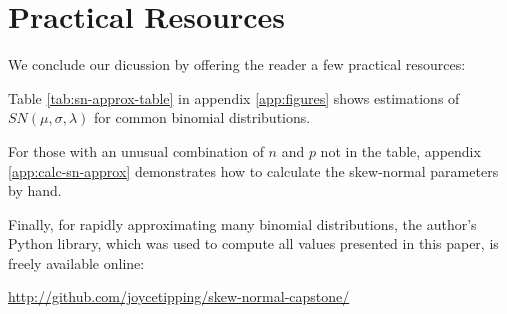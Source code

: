 \section{Practical Resources}
\label{sec:resources}

We conclude our dicussion by offering the reader a few practical resources:

Table \ref{tab:sn-approx-table} in appendix \ref{app:figures} shows estimations
of $SN(\mu, \sigma, \lambda)$ for common binomial distributions.

For those with an unusual combination of $n$ and $p$ not in the table, appendix
\ref{app:calc-sn-approx} demonstrates how to calculate the skew-normal
parameters by hand.

Finally, for rapidly approximating many binomial distributions, the author's
Python library, which was used to compute all values presented in this paper,
is freely available online:

\url{http://github.com/joycetipping/skew-normal-capstone/}

\clearpage
